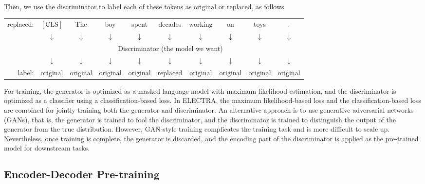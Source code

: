 Then, we use the discriminator to label each of these tokens as $\mathrm{original}$ or $\mathrm{replaced}$, as follows

\vspace{0.5em}
\begin{center}
\begingroup
\renewcommand{\arraystretch}{1.2}
\setlength{\tabcolsep}{3pt}
\begin{tabular}{r c c c c c c c c c}
replaced: & $[\mathrm{CLS}]$ & The & boy & spent & {\color{red} decades} & working & on & {\color{red} toys} & . \\
& $\downarrow$ & $\downarrow$ & $\downarrow$ & $\downarrow$ & {\color{red} $\downarrow$} & $\downarrow$ & $\downarrow$ & {\color{red} $\downarrow$} & $\downarrow$ \\ \cline{2-10}
& \multicolumn{9}{|c|}{Discriminator (the model we want)} \\ \cline{2-10}
& $\downarrow$ & $\downarrow$ & $\downarrow$ & $\downarrow$ & {\color{red} $\downarrow$} & $\downarrow$ & $\downarrow$ & {\color{red} $\downarrow$} & $\downarrow$ \\
label: & \footnotesize{$\mathrm{original}$} & \footnotesize{$\mathrm{original}$} & \footnotesize{$\mathrm{original}$} & \footnotesize{$\mathrm{original}$} & {\color{red} \footnotesize{$\mathrm{replaced}$}} & \footnotesize{$\mathrm{original}$} & \footnotesize{$\mathrm{original}$} & {\color{red} \footnotesize{$\mathrm{original}$}} & \footnotesize{$\mathrm{original}$}
\end{tabular}
\endgroup
\end{center}
\vspace{0.5em}

For training, the generator is optimized as a masked language model with maximum likelihood estimation, and the discriminator is optimized as a classifier using a classification-based loss. In ELECTRA, the maximum likelihood-based loss and the classification-based loss are combined for jointly training both the generator and discriminator. An alternative approach is to use generative adversarial networks (GANs), that is, the generator is trained to fool the discriminator, and the discriminator is trained to distinguish the output of the generator from the true distribution. However, GAN-style training complicates the training task and is more difficult to scale up. Nevertheless, once training is complete, the generator is discarded, and the encoding part of the discriminator is applied as the pre-trained model for downstream tasks.

\subsection{Encoder-Decoder Pre-training}

